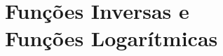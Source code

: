 \chapter[Funções Inversas e Funções Logarítmicas]%
        {Funções Inversas e\\Funções Logarítmicas}

\minitoc







